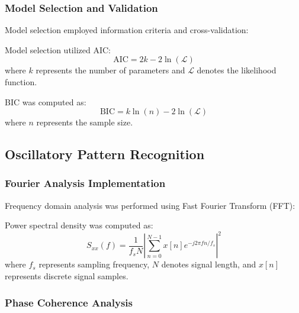 \subsubsection{Model Selection and Validation}

Model selection employed information criteria and cross-validation:

\begin{definition}
Model selection utilized AIC:
\begin{equation}
\text{AIC} = 2k - 2\ln(\mathcal{L})
\end{equation}
where $k$ represents the number of parameters and $\mathcal{L}$ denotes the likelihood function.
\end{definition}

\begin{definition}
BIC was computed as:
\begin{equation}
\text{BIC} = k\ln(n) - 2\ln(\mathcal{L})
\end{equation}
where $n$ represents the sample size.
\end{definition}

\subsection{Oscillatory Pattern Recognition}

\subsubsection{Fourier Analysis Implementation}

Frequency domain analysis was performed using Fast Fourier Transform (FFT):

\begin{definition}
Power spectral density was computed as:
\begin{equation}
S_{xx}(f) = \frac{1}{f_s N} \left| \sum_{n=0}^{N-1} x[n] e^{-j2\pi fn/f_s} \right|^2
\end{equation}
where $f_s$ represents sampling frequency, $N$ denotes signal length, and $x[n]$ represents discrete signal samples.
\end{definition}

\subsubsection{Phase Coherence Analysis}

